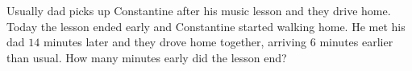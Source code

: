 Usually dad picks up Constantine after his music lesson and they drive home. Today the lesson ended early and Constantine started walking home. He met his dad $14$ minutes later and they drove home together, arriving $6$ minutes earlier than usual. How many minutes early did the lesson end?
